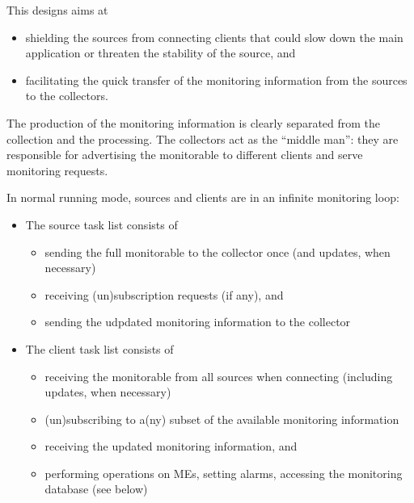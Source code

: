 \documentclass{cmspaper}
\begin{document}
This designs aims at
%
\begin{itemize}
\item{shielding the sources from connecting clients
that could slow down the main application or threaten the stability of
the source, and}
\item{facilitating the quick transfer of the monitoring
information from the sources to the collectors.} 
\end{itemize}
%
The production of the monitoring information is clearly separated from
the collection and the processing. The collectors act as the ``middle
man'': they are responsible for advertising the monitorable to
different clients and serve monitoring requests.

In normal running mode, sources and clients are in an infinite
monitoring loop:
%
\begin{itemize}
\item{
The source task list consists of 
\begin{itemize}
\item{sending the full monitorable to the collector once (and updates,
when necessary)}
\item{receiving (un)subscription requests (if any), and}
\item{sending the udpdated monitoring information to the collector}
\end{itemize}
}
\item{
The client task list consists of 
\begin{itemize}
\item{receiving the monitorable from all sources when connecting
(including updates, when necessary)}
\item{(un)subscribing to a(ny) subset of the available monitoring
information}
\item{receiving the updated monitoring information, and}
\item{performing operations on MEs, setting alarms,
accessing the monitoring database (see below)}
\end{itemize}
}
\end{itemize}
%
%
\end{document}
